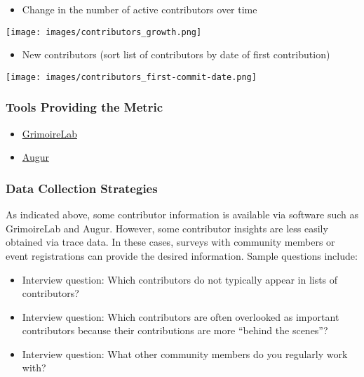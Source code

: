 \documentclass[
  12pt,
]{article}
\providecommand{\tightlist}{%
  \setlength{\itemsep}{0pt}\setlength{\parskip}{0pt}}
\begin{document}
\begin{itemize}
\tightlist
\item
  Change in the number of active contributors over time
\end{itemize}

\texttt{[image: images/contributors\_growth.png]}

\begin{itemize}
\tightlist
\item
  New contributors (sort list of contributors by date of first
  contribution)
\end{itemize}

\texttt{[image: images/contributors\_first-commit-date.png]}

\hypertarget{tools-providing-the-metric-6}{%
\subsubsection{Tools Providing the
Metric}\label{tools-providing-the-metric-6}}

\begin{itemize}
\tightlist
\item
  \href{https://chaoss.github.io/grimoirelab/}{GrimoireLab}
\item
  \href{http://augur.osshealth.io/api_docs/\#api-Evolution-Contributors_Repo_}{Augur}
\end{itemize}

\hypertarget{data-collection-strategies-5}{%
\subsubsection{Data Collection
Strategies}\label{data-collection-strategies-5}}

As indicated above, some contributor information is available via
software such as GrimoireLab and Augur. However, some contributor
insights are less easily obtained via trace data. In these cases,
surveys with community members or event registrations can provide the
desired information. Sample questions include:

\begin{itemize}
\tightlist
\item
  Interview question: Which contributors do not typically appear in
  lists of contributors?
\item
  Interview question: Which contributors are often overlooked as
  important contributors because their contributions are more ``behind
  the scenes''?
\item
  Interview question: What other community members do you regularly work
  with?
\end{itemize}
\end{document}
